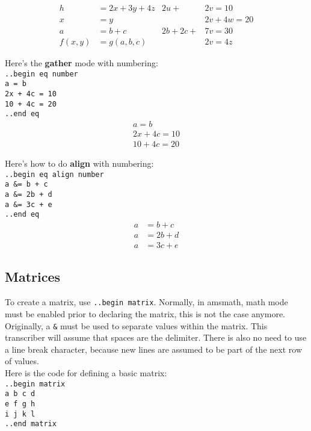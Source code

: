 \documentclass[12pt]{article}
\begin{document}
\begin{flushleft}
\begin{align*}
h &= 2x + 3y + 4z			&	2u + &2v = 10 \\
x &= y						&	&2v + 4w = 20 \\
a &= b + c					&	2b + 2c + &7v = 30 \\
f(x, y) &= g(a, b, c)		&	&2v = 4z 
\end{align*}

\medskip

Here's the \textbf{gather} mode with numbering: \\
\verb|..begin eq number|\\
\verb|a = b|\\
\verb|2x + 4c = 10|\\
\verb|10 + 4c = 20|\\
\verb|..end eq|
\begin{gather}
a = b \\
2x + 4c = 10 \\
10 + 4c = 20 
\end{gather}

\medskip

Here's how to do \textbf{align} with numbering: \\
\verb|..begin eq align number|\\
\verb|a &= b + c|\\
\verb|a &= 2b + d|\\
\verb|a &= 3c + e|\\
\verb|..end eq|
\begin{align}
a &= b + c \\
a &= 2b + d \\
a &= 3c + e 
\end{align}

\newpage

\subsection*{Matrices}

To create a matrix, use \verb|..begin matrix|. Normally, in amsmath, math mode must be enabled prior to declaring the matrix, this is not the case anymore. \\
Originally, a \verb|&| must be used to separate values within the matrix. This transcriber will assume that spaces are the delimiter. There is also no need to use a line break character, because new lines are assumed to be part of the next row of values. \\
Here is the code for defining a basic matrix: \\
\verb|..begin matrix|\\
\verb|a b c d|\\
\verb|e f g h|\\
\verb|i j k l|\\
\verb|..end matrix|


\end{flushleft}
\end{document}
